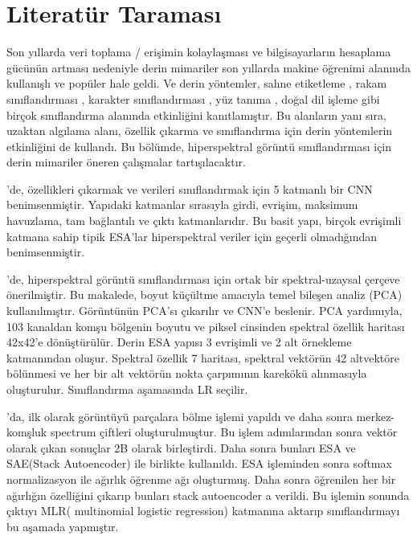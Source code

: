 \chapter{Literatür Taraması}

Son yıllarda veri toplama / erişimin kolaylaşması ve bilgisayarların hesaplama gücünün artması nedeniyle derin mimariler son yıllarda makine öğrenimi alanında kullanışlı ve popüler hale geldi. Ve derin yöntemler, sahne etiketleme \citep{farabet2012learning}, rakam sınıflandırması \citep{sermanet2012convolutional}, karakter sınıflandırması \citep{ciresan2011convolutional}, yüz tanıma \citep{lawrence1997face}, doğal dil işleme \citep{kalchbrenner2014convolutional} gibi birçok sınıflandırma alanında etkinliğini kanıtlamıştır. Bu alanların yanı sıra, uzaktan algılama alanı, özellik çıkarma ve sınıflandırma için derin yöntemlerin etkinliğini de kullandı.
Bu bölümde, hiperspektral görüntü sınıflandırması için derin mimariler öneren çalışmalar tartışılacaktır.

\citep{hu2015deep} 'de, özellikleri çıkarmak ve verileri sınıflandırmak için 5 katmanlı bir CNN benimsenmiştir. Yapıdaki katmanlar sırasıyla girdi, evrişim, maksimum havuzlama, tam bağlantılı ve çıktı katmanlarıdır. Bu basit yapı, birçok evrişimli katmana sahip tipik ESA'lar hiperspektral veriler için geçerli olmadığından benimsenmiştir.

\citep{yue2015spectral} 'de, hiperspektral görüntü sınıflandırması için ortak bir spektral-uzaysal çerçeve önerilmiştir. Bu makalede, boyut küçültme amacıyla temel bileşen analiz (PCA) kullanılmıştır. Görüntünün PCA'sı çıkarılır ve CNN'e beslenir. PCA yardımıyla, 103 kanaldan  komşu bölgenin boyutu ve piksel cinsinden spektral özellik haritası 42x42'e dönüştürülür.
  Derin ESA yapısı 3 evrişimli ve 2 alt örnekleme katmanından oluşur. Spektral özellik 7 haritası, spektral vektörün 42 altvektöre bölünmesi ve her bir alt vektörün nokta çarpımının karekökü alınmasıyla oluşturulur. Sınıflandırma aşamasında LR seçilir.

\citep{li2019adaptive} 'da, ilk olarak görüntüyü parçalara bölme işlemi yapıldı ve daha sonra merkez-komşluk spectrum çiftleri oluşturulmuştur. Bu işlem adımlarından sonra vektör olarak çıkan sonuçlar 2B olarak birleştirdi. Daha sonra bunları ESA ve SAE(Stack Autoencoder) ile birlikte kullanıldı. ESA işleminden sonra softmax normalizasyon ile ağırlık öğrenme ağı oluşturmuş. Daha sonra öğrenilen her bir ağırlığın özelliğini çıkarıp bunları stack autoencoder a verildi. Bu işlemin sonunda çıktıyı MLR( multinomial logistic regression) katmanına aktarıp sınıflandırmayı bu aşamada yapmıştır.

